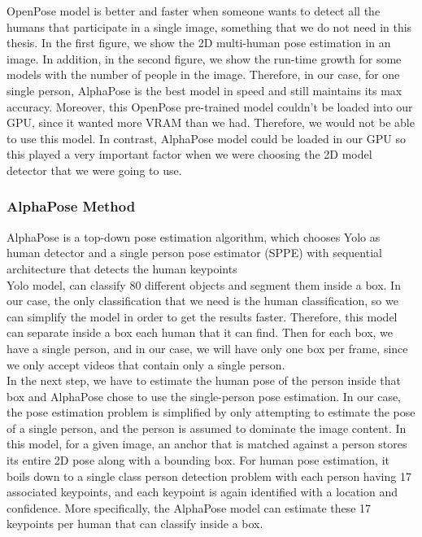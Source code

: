 OpenPose model is better and faster when someone wants to detect all the humans that participate in a single image, something that we do not need in this thesis. In the first figure, we show the 2D multi-human pose estimation in an image. In addition, in the second figure, we show the run-time growth for some models with the number of people in the image. Therefore, in our case, for one single person, AlphaPose is the best model in speed and still maintains its max accuracy. Moreover, this OpenPose pre-trained model couldn't be loaded into our GPU, since it wanted more VRAM than we had. Therefore, we would not be able to use this model. In contrast, AlphaPose model could be loaded in our GPU so this played a very important factor when we were choosing the 2D model detector that we were going to use.\\


\subsubsection*{AlphaPose Method}

AlphaPose is a top-down pose estimation algorithm, which chooses Yolo \cite{YOLO-Pose,YOLOv3} as human detector and a single person pose estimator (SPPE) \cite{SPPE} with sequential architecture that detects the human keypoints\\

Yolo model, can classify 80 different objects and segment them inside a box. In our case, the only classification that we need is the human classification, so we can simplify the model in order to get the results faster. Therefore, this model can separate inside a box each human that it can find. Then for each box, we have a single person, and in our case, we will have only one box per frame, since we only accept videos that contain only a single person. \\

In the next step, we have to estimate the human pose of the person inside that box and AlphaPose chose to use the single-person pose estimation. In our case, the pose estimation problem is simplified by only attempting to estimate the pose of a single person, and the person is assumed to dominate the image content. In this model, for a given image, an anchor that is matched against a person stores its entire 2D pose along with a bounding box. For human pose estimation, it boils down to a single class person detection problem with each person having 17 associated keypoints, and each keypoint is again identified with a location and confidence. More specifically, the AlphaPose model can estimate these 17 keypoints per human that can classify inside a box.\\


